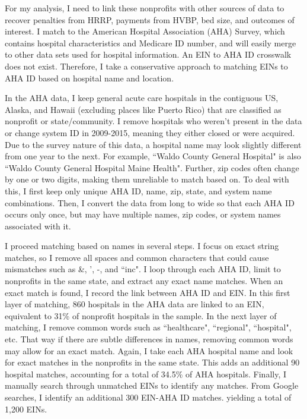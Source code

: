 \documentclass[12pt]{article}
\begin{document}
For my analysis, I need to link these nonprofits with other sources of data to recover penalties from HRRP, payments from HVBP, bed size, and outcomes of interest. I match to the American Hospital Association (AHA) Survey, which contains hospital characteristics and Medicare ID number, and will easily merge to other data sets used for hospital information. An EIN to AHA ID crosswalk does not exist. Therefore, I take a conservative approach to matching EINs to AHA ID based on hospital name and location. 

In the AHA data, I keep general acute care hospitals in the contiguous US, Alaska, and Hawaii (excluding places like Puerto Rico) that are classified as nonprofit or state/community. I remove hospitals who weren't present in the data or change system ID in 2009-2015, meaning they either closed or were acquired. Due to the survey nature of this data, a hospital name may look slightly different from one year to the next. For example, ``Waldo County General Hospital" is also ``Waldo County General Hospital Maine Health". Further, zip codes often change by one or two digits, making them unreliable to match based on. To deal with this, I first keep only unique AHA ID, name, zip, state, and system name combinations. Then, I convert the data from long to wide so that each AHA ID occurs only once, but may have multiple names, zip codes, or system names associated with it.

I proceed matching based on names in several steps. I focus on exact string matches, so I remove all spaces and common characters that could cause mismatches such as \&, ', -, and ``inc". I loop through each AHA ID, limit to nonprofits in the same state, and extract any exact name matches. When an exact match is found, I record the link between AHA ID and EIN. In this first layer of matching, 860 hospitals in the AHA data are linked to an EIN, equivalent to 31\% of nonprofit hospitals in the sample. In the next layer of matching, I remove common words such as ``healthcare", ``regional", ``hospital", etc. That way if there are subtle differences in names, removing common words may allow for an exact match. Again, I take each AHA hospital name and look for exact matches in the nonprofits in the same state. This adds an additional 90 hospital matches, accounting for a total of 34.5\% of AHA hospitals. Finally, I manually search through unmatched EINs to identify any matches. From Google searches, I identify an additional 300 EIN-AHA ID matches. yielding a total of 1,200 EINs. 
\end{document}
